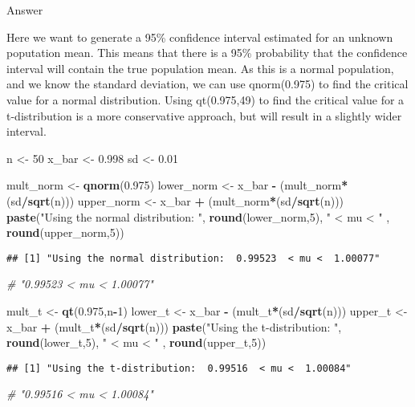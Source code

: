 \documentclass[]{article}
\newenvironment{Shaded}{\begin{snugshade}}{\end{snugshade}}
\newcommand{\KeywordTok}[1]{\textcolor[rgb]{0.13,0.29,0.53}{\textbf{#1}}}
\newcommand{\DecValTok}[1]{\textcolor[rgb]{0.00,0.00,0.81}{#1}}
\newcommand{\FloatTok}[1]{\textcolor[rgb]{0.00,0.00,0.81}{#1}}
\newcommand{\StringTok}[1]{\textcolor[rgb]{0.31,0.60,0.02}{#1}}
\newcommand{\CommentTok}[1]{\textcolor[rgb]{0.56,0.35,0.01}{\textit{#1}}}
\newcommand{\OperatorTok}[1]{\textcolor[rgb]{0.81,0.36,0.00}{\textbf{#1}}}
\newcommand{\NormalTok}[1]{#1}
\begin{document}
Answer

Here we want to generate a 95\% confidence interval estimated for an
unknown poputation mean. This means that there is a 95\% probability
that the confidence interval will contain the true population mean. As
this is a normal population, and we know the standard deviation, we can
use qnorm(0.975) to find the critical value for a normal distribution.
Using qt(0.975,49) to find the critical value for a t-distribution is a
more conservative approach, but will result in a slightly wider
interval.

\begin{Shaded}
\begin{Highlighting}[]
\NormalTok{n <-}\StringTok{  }\DecValTok{50}
\NormalTok{x_bar <-}\StringTok{ }\FloatTok{0.998}
\NormalTok{sd <-}\StringTok{ }\FloatTok{0.01}

\NormalTok{mult_norm <-}\StringTok{ }\KeywordTok{qnorm}\NormalTok{(}\FloatTok{0.975}\NormalTok{)}
\NormalTok{lower_norm <-}\StringTok{ }\NormalTok{x_bar }\OperatorTok{-}\StringTok{ }\NormalTok{(mult_norm}\OperatorTok{*}\NormalTok{(sd}\OperatorTok{/}\KeywordTok{sqrt}\NormalTok{(n)))}
\NormalTok{upper_norm <-}\StringTok{ }\NormalTok{x_bar }\OperatorTok{+}\StringTok{ }\NormalTok{(mult_norm}\OperatorTok{*}\NormalTok{(sd}\OperatorTok{/}\KeywordTok{sqrt}\NormalTok{(n)))}
\KeywordTok{paste}\NormalTok{(}\StringTok{"Using the normal distribution: "}\NormalTok{, }\KeywordTok{round}\NormalTok{(lower_norm,}\DecValTok{5}\NormalTok{), }\StringTok{" < mu < "}\NormalTok{ , }\KeywordTok{round}\NormalTok{(upper_norm,}\DecValTok{5}\NormalTok{))}
\end{Highlighting}
\end{Shaded}

\begin{verbatim}
## [1] "Using the normal distribution:  0.99523  < mu <  1.00077"
\end{verbatim}

\begin{Shaded}
\begin{Highlighting}[]
\CommentTok{# "0.99523  < mu <  1.00077"}

\NormalTok{mult_t    <-}\StringTok{ }\KeywordTok{qt}\NormalTok{(}\FloatTok{0.975}\NormalTok{,n}\OperatorTok{-}\DecValTok{1}\NormalTok{)}
\NormalTok{lower_t <-}\StringTok{ }\NormalTok{x_bar }\OperatorTok{-}\StringTok{ }\NormalTok{(mult_t}\OperatorTok{*}\NormalTok{(sd}\OperatorTok{/}\KeywordTok{sqrt}\NormalTok{(n)))}
\NormalTok{upper_t <-}\StringTok{ }\NormalTok{x_bar }\OperatorTok{+}\StringTok{ }\NormalTok{(mult_t}\OperatorTok{*}\NormalTok{(sd}\OperatorTok{/}\KeywordTok{sqrt}\NormalTok{(n)))}
\KeywordTok{paste}\NormalTok{(}\StringTok{"Using the t-distribution: "}\NormalTok{, }\KeywordTok{round}\NormalTok{(lower_t,}\DecValTok{5}\NormalTok{), }\StringTok{" < mu < "}\NormalTok{ , }\KeywordTok{round}\NormalTok{(upper_t,}\DecValTok{5}\NormalTok{))}
\end{Highlighting}
\end{Shaded}

\begin{verbatim}
## [1] "Using the t-distribution:  0.99516  < mu <  1.00084"
\end{verbatim}

\begin{Shaded}
\begin{Highlighting}[]
\CommentTok{# "0.99516  < mu <  1.00084"}
\end{Highlighting}
\end{Shaded}
\end{document}
